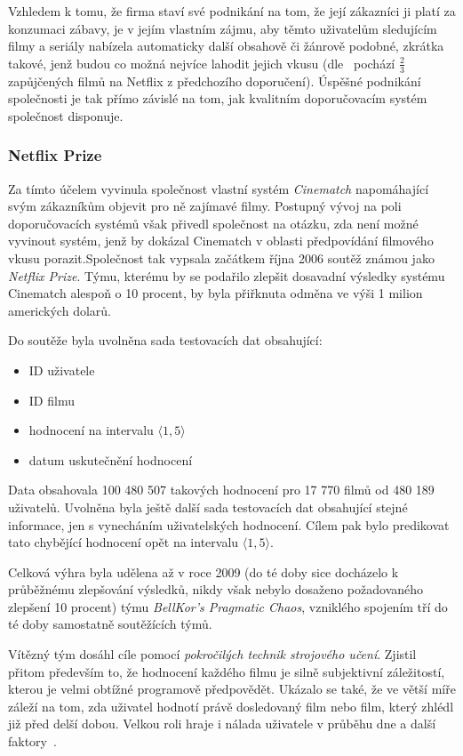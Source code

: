 \documentclass[thesis=M,czech]{FITthesis}[2014/05/07]
\begin{document}
Vzhledem k tomu, že firma staví své podnikání na tom, že její zákazníci ji platí za konzumaci zábavy, je v jejím vlastním zájmu, aby těmto uživatelům sledujícím filmy a seriály nabízela automaticky další obsahově či žánrově podobné, zkrátka takové, jenž budou co možná nejvíce lahodit jejich vkusu (dle~\cite{netflixrec} pochází $\frac{2}{3}$ zapůjčených filmů na Netflix z předchozího doporučení). Úspěšné podnikání společnosti je tak přímo závislé na tom, jak kvalitním doporučovacím systém společnost disponuje. 

\subsubsection{Netflix Prize}

\cite{netflixrules} Za tímto účelem vyvinula společnost vlastní systém \emph{Cinematch} napomáhající svým zákazníkům objevit pro ně zajímavé filmy. Postupný vývoj na poli doporučovacích systémů však přivedl společnost na otázku, zda není možné vyvinout systém, jenž by dokázal Cinematch v oblasti předpovídání filmového vkusu porazit.Společnost tak vypsala začátkem října 2006 soutěž známou jako \emph{Netflix Prize}. Týmu, kterému by se podařilo zlepšit dosavadní výsledky systému Cinematch alespoň o 10 procent, by byla přiřknuta odměna ve výši 1 milion amerických dolarů.

Do soutěže byla uvolněna sada testovacích dat obsahující:

\begin{itemize}
	\item ID uživatele
	\item ID filmu
	\item hodnocení na intervalu $\langle1,5\rangle$
	\item datum uskutečnění hodnocení
\end{itemize}

Data obsahovala 100 480 507 takových hodnocení pro 17 770 filmů od 480 189 uživatelů. Uvolněna byla ještě další sada testovacích dat obsahující stejné informace, jen s vynecháním uživatelských hodnocení. Cílem pak bylo predikovat tato chybějící hodnocení opět na intervalu $\langle1,5\rangle$.

Celková výhra byla udělena až v roce 2009 (do té doby sice docházelo k průběžnému zlepšování výsledků, nikdy však nebylo dosaženo požadovaného zlepšení 10 procent) týmu \emph{BellKor's Pragmatic Chaos}, vzniklého spojením tří do té doby samostatně soutěžících týmů.

Vítězný tým dosáhl cíle pomocí \emph{pokročilých technik strojového učení}. Zjistil přitom především to, že hodnocení každého filmu je silně subjektivní záležitostí, kterou je velmi obtížné programově předpovědět. Ukázalo se také, že ve větší míře záleží na tom, zda uživatel hodnotí právě dosledovaný film nebo film, který zhlédl již před delší dobou. Velkou roli hraje i nálada uživatele v průběhu dne a další faktory~\cite{bellkor}.
\end{document}
